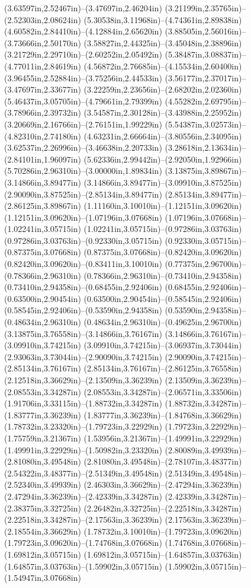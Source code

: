 (3.63597in,2.52467in)--(3.47697in,2.46204in) (3.21199in,2.35765in)--(2.52303in,2.08624in) (5.30538in,3.11968in)--(4.74361in,2.89838in) (4.60582in,2.84410in)--(4.12884in,2.65620in) (3.88505in,2.56016in)--(3.73666in,2.50170in) (3.58827in,2.44325in)--(3.45048in,2.38896in) (3.21729in,2.29710in)--(2.60252in,2.05492in) (5.38487in,3.08837in)--(4.77011in,2.84619in) (4.56872in,2.76685in)--(4.15534in,2.60400in) (3.96455in,2.52884in)--(3.75256in,2.44533in) (3.56177in,2.37017in)--(3.47697in,2.33677in) (3.22259in,2.23656in)--(2.68202in,2.02360in) (5.46437in,3.05705in)--(4.79661in,2.79399in) (4.55282in,2.69795in)--(3.78966in,2.39732in) (3.54587in,2.30128in)--(3.43988in,2.25952in) (3.20669in,2.16766in)--(2.76151in,1.99229in) (5.54387in,3.02573in)--(4.82310in,2.74180in) (4.63231in,2.66664in)--(3.80556in,2.34095in) (3.62537in,2.26996in)--(3.46638in,2.20733in) (3.28618in,2.13634in)--(2.84101in,1.96097in) (5.62336in,2.99442in)--(2.92050in,1.92966in) (5.70286in,2.96310in)--(3.00000in,1.89834in) (3.13875in,3.89867in)--(3.14866in,3.89477in) (3.14866in,3.89477in)--(3.09910in,3.87525in) (2.90090in,3.87525in)--(2.85134in,3.89477in) (2.85134in,3.89477in)--(2.86125in,3.89867in) (1.11160in,3.10010in)--(1.12151in,3.09620in) (1.12151in,3.09620in)--(1.07196in,3.07668in) (1.07196in,3.07668in)--(1.02241in,3.05715in) (1.02241in,3.05715in)--(0.97286in,3.03763in) (0.97286in,3.03763in)--(0.92330in,3.05715in) (0.92330in,3.05715in)--(0.87375in,3.07668in) (0.87375in,3.07668in)--(0.82420in,3.09620in) (0.82420in,3.09620in)--(0.83411in,3.10010in) (0.77375in,2.96700in)--(0.78366in,2.96310in) (0.78366in,2.96310in)--(0.73410in,2.94358in) (0.73410in,2.94358in)--(0.68455in,2.92406in) (0.68455in,2.92406in)--(0.63500in,2.90454in) (0.63500in,2.90454in)--(0.58545in,2.92406in) (0.58545in,2.92406in)--(0.53590in,2.94358in) (0.53590in,2.94358in)--(0.48634in,2.96310in) (0.48634in,2.96310in)--(0.49625in,2.96700in) (3.13875in,3.76558in)--(3.14866in,3.76167in) (3.14866in,3.76167in)--(3.09910in,3.74215in) (3.09910in,3.74215in)--(3.06937in,3.73044in) (2.93063in,3.73044in)--(2.90090in,3.74215in) (2.90090in,3.74215in)--(2.85134in,3.76167in) (2.85134in,3.76167in)--(2.86125in,3.76558in) (2.12518in,3.36629in)--(2.13509in,3.36239in) (2.13509in,3.36239in)--(2.08553in,3.34287in) (2.08553in,3.34287in)--(2.06571in,3.33506in) (1.91706in,3.33115in)--(1.88732in,3.34287in) (1.88732in,3.34287in)--(1.83777in,3.36239in) (1.83777in,3.36239in)--(1.84768in,3.36629in) (1.78732in,3.23320in)--(1.79723in,3.22929in) (1.79723in,3.22929in)--(1.75759in,3.21367in) (1.53956in,3.21367in)--(1.49991in,3.22929in) (1.49991in,3.22929in)--(1.50982in,3.23320in) (2.80089in,3.49939in)--(2.81080in,3.49548in) (2.81080in,3.49548in)--(2.78107in,3.48377in) (2.54322in,3.48377in)--(2.51349in,3.49548in) (2.51349in,3.49548in)--(2.52340in,3.49939in) (2.46303in,3.36629in)--(2.47294in,3.36239in) (2.47294in,3.36239in)--(2.42339in,3.34287in) (2.42339in,3.34287in)--(2.38375in,3.32725in) (2.26482in,3.32725in)--(2.22518in,3.34287in) (2.22518in,3.34287in)--(2.17563in,3.36239in) (2.17563in,3.36239in)--(2.18554in,3.36629in) (1.78732in,3.10010in)--(1.79723in,3.09620in) (1.79723in,3.09620in)--(1.74768in,3.07668in) (1.74768in,3.07668in)--(1.69812in,3.05715in) (1.69812in,3.05715in)--(1.64857in,3.03763in) (1.64857in,3.03763in)--(1.59902in,3.05715in) (1.59902in,3.05715in)--(1.54947in,3.07668in) 